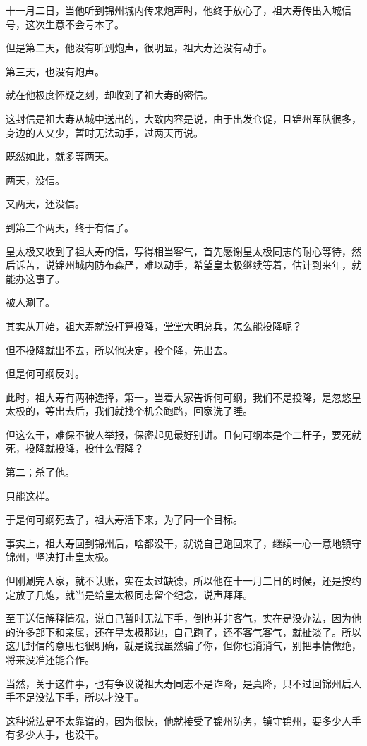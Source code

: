 \begin{multicols}{\theparacolNo}
		十一月二日，当他听到锦州城内传来炮声时，他终于放心了，祖大寿传出入城信号，这次生意不会亏本了。

		但是第二天，他没有听到炮声，很明显，祖大寿还没有动手。

		第三天，也没有炮声。

		就在他极度怀疑之刻，却收到了祖大寿的密信。

		这封信是祖大寿从城中送出的，大致内容是说，由于出发仓促，且锦州军队很多，身边的人又少，暂时无法动手，过两天再说。

		既然如此，就多等两天。

		两天，没信。

		又两天，还没信。

		到第三个两天，终于有信了。

		皇太极又收到了祖大寿的信，写得相当客气，首先感谢皇太极同志的耐心等待，然后诉苦，说锦州城内防布森严，难以动手，希望皇太极继续等着，估计到来年，就能办这事了。

		被人涮了。

		其实从开始，祖大寿就没打算投降，堂堂大明总兵，怎么能投降呢？

		但不投降就出不去，所以他决定，投个降，先出去。

		但是何可纲反对。

		此时，祖大寿有两种选择，第一，当着大家告诉何可纲，我们不是投降，是忽悠皇太极的，等出去后，我们就找个机会跑路，回家洗了睡。

		但这么干，难保不被人举报，保密起见最好别讲。且何可纲本是个二杆子，要死就死，投降就投降，投什么假降？

		第二；杀了他。

		只能这样。

		于是何可纲死去了，祖大寿活下来，为了同一个目标。

		事实上，祖大寿回到锦州后，啥都没干，就说自己跑回来了，继续一心一意地镇守锦州，坚决打击皇太极。

		但刚涮完人家，就不认账，实在太过缺德，所以他在十一月二日的时候，还是按约定放了几炮，就当是给皇太极同志留个纪念，说声拜拜。

		至于送信解释情况，说自己暂时无法下手，倒也并非客气，实在是没办法，因为他的许多部下和亲属，还在皇太极那边，自己跑了，还不客气客气，就扯淡了。所以这几封信的意思也很明确，就是说我虽然骗了你，但你也消消气，别把事情做绝，将来没准还能合作。

		当然，关于这件事，也有争议说祖大寿同志不是诈降，是真降，只不过回锦州后人手不足没法下手，所以才没干。

		这种说法是不太靠谱的，因为很快，他就接受了锦州防务，镇守锦州，要多少人手有多少人手，也没干。


\end{multicols}

